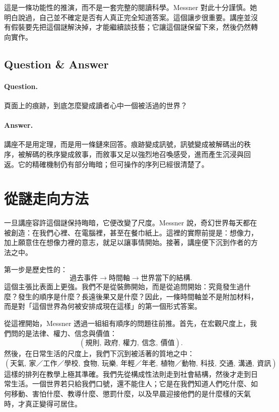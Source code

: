 這是一條功能性的推演，而不是一套完整的閱讀科學。Messner 對此十分謹慎。她明白說過，自己並不確定是否有人真正完全知道答案。這個讓步很重要。講座並沒有假裝要先把這個謎解決掉，才能繼續談技藝；它讓這個謎保留下來，然後仍然轉向實作。

\subsection{Question \& Answer}

\paragraph{Question.} 頁面上的痕跡，到底怎麼變成讀者心中一個被活過的世界？

\paragraph{Answer.} 講座不是用定理，而是用一條鏈來回答。痕跡變成訊號，訊號變成被解碼出的秩序，被解碼的秩序變成敘事，而敘事又足以強烈地召喚感受，進而產生沉浸與回返。它的精確機制仍有部分晦暗；但可操作的序列已經很清楚了。

\section{從謎走向方法}

一旦講座容許這個謎保持晦暗，它便改變了尺度。Messner 說，奇幻世界每天都在被創造：在我們心裡、在電腦裡，甚至在餐巾紙上。這裡的實際前提是：想像力，加上願意住在想像力裡的意志，就足以讓事情開始。接著，講座便下沉到作者的方法之中。

第一步是歷史性的：
\begin{equation}
\text{過去事件} \to \text{時間軸} \to \text{世界當下的結構}.
\end{equation}
這個主張比表面上更強。我們不是從裝飾開始，而是從追問開始：究竟發生過什麼？發生的順序是什麼？長遠後果又是什麼？因此，一條時間軸並不是附加材料，而是對「這個世界為何被安排成現在這樣」的第一個形式答案。

從這裡開始，Messner 透過一組組有順序的問題往前推。首先，在宏觀尺度上，我們問的是法律、權力、信念與價值：
\begin{equation}
(\text{規則},\ \text{政府},\ \text{權力},\ \text{信念},\ \text{價值}).
\end{equation}
然後，在日常生活的尺度上，我們下沉到被活著的質地之中：
\begin{equation}
(\text{天氣},\ \text{家／工作／學校},\ \text{食物},\ \text{玩樂},\ \text{年輕／年老},\ \text{植物／動物},\ \text{科技},\ \text{交通},\ \text{溝通},\ \text{資訊}).
\end{equation}
這樣的排列在教學上極其準確。我們先從構成性法則走到社會結構，然後才走到日常生活。一個世界若只給我們口號，還不能住人；它是在我們知道人們吃什麼、如何移動、害怕什麼、教導什麼、懲罰什麼，以及早晨迎接他們的是什麼樣的天氣時，才真正變得可居住。

